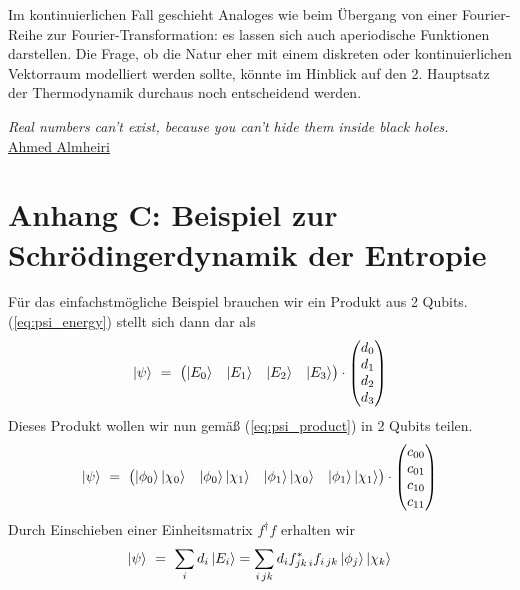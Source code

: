\documentclass[12pt]{article}
\begin{document}
Im kontinuierlichen Fall geschieht Analoges wie beim Übergang von einer Fourier-Reihe zur Fourier-Transformation: es lassen sich auch aperiodische Funktionen darstellen. Die Frage, ob die Natur eher mit einem diskreten oder kontinuierlichen Vektorraum modelliert werden sollte, könnte im Hinblick auf den 2. Hauptsatz der Thermodynamik durchaus noch entscheidend werden.
\begin{center}
\textit{Real numbers can’t exist, because you can’t hide them inside black holes.} \\
\href{https://www.quantamagazine.org/does-time-really-flow-new-clues-come-from-a-century-old-approach-to-math-20200407/}{Ahmed Almheiri}
\end{center}

\section{Anhang C: Beispiel zur Schrödingerdynamik der Entropie}
Für das einfachstmögliche Beispiel brauchen wir ein Produkt aus 2 Qubits. (\ref{eq:psi_energy}) stellt sich dann dar als 
\begin{equation*}
\ket{\psi}\ =\ \begin{pmatrix}
\ket{E_0} & \ket{E_1} & \ket{E_2} & \ket{E_3}
\end{pmatrix}
\cdot
\begin{pmatrix}
d_0 \\ d_1 \\ d_2 \\ d_3 
\end{pmatrix}
\end{equation*}
Dieses Produkt wollen wir nun gemäß (\ref{eq:psi_product}) in 2 Qubits teilen.
\begin{equation*}
\ket{\psi}\ =\ \begin{pmatrix}
\ket{\phi_0}\ket{\chi_0} & \ket{\phi_0}\ket{\chi_1} & \ket{\phi_1}\ket{\chi_0} & \ket{\phi_1}\ket{\chi_1}
\end{pmatrix}
\cdot
\begin{pmatrix}
c_{00} \\ c_{01} \\ c_{10} \\ c_{11}
\end{pmatrix}
\end{equation*}
Durch Einschieben einer Einheitsmatrix $ f^\dagger f$ erhalten wir
\begin{equation*}
\ket{\psi}\ =\ \sum_i d_i \ket{E_i} = \sum_{i\,jk} d_i f_{jk\,i}^* f_{i\,jk} \ket{\phi_j}\ket{\chi_k}
\end{equation*}
\end{document}
